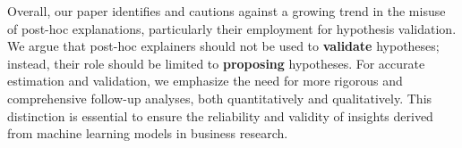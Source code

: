 \documentclass[mnsc,blindrev]{informs3}
\begin{document}





Overall, our paper identifies and cautions against a growing trend in the misuse of post-hoc explanations, particularly their employment for hypothesis validation. We argue that post-hoc explainers should not be used to \textbf{validate} hypotheses; instead, their role should be limited to \textbf{proposing} hypotheses. For accurate estimation and validation, we emphasize the need for more rigorous and comprehensive follow-up analyses, both quantitatively and qualitatively. This distinction is essential to ensure the reliability and validity of insights derived from machine learning models in business research. %
\end{document}
